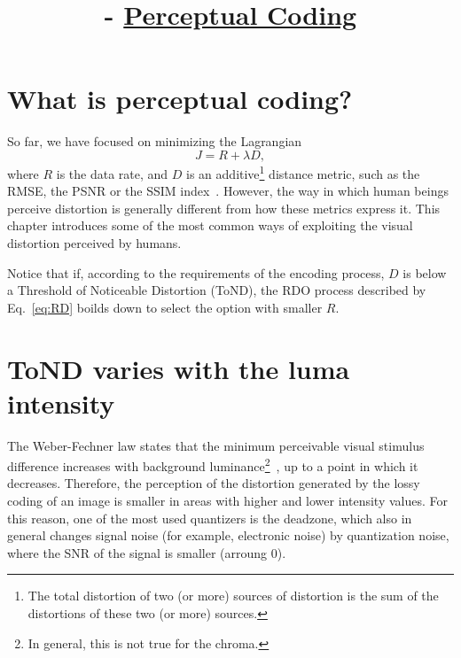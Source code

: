 

\title{\SM{} - \href{https://github.com/Sistemas-Multimedia/Sistemas-Multimedia.github.io/tree/master/contents/perceptual_coding}{Perceptual Coding}}

\maketitle
\tableofcontents

\section{What is perceptual coding?}

So far, we have focused on minimizing the
Lagrangian~\cite{sullivan1998rate}
\begin{equation}
  J = R + \lambda D,
  \label{eq:RD}
\end{equation}
where $R$ is the data rate, and $D$ is an additive\footnote{The total
distortion of two (or more) sources of distortion is the sum of the
distortions of these two (or more) sources.} distance metric, such as
the RMSE, the PSNR or the SSIM index~\cite{wang2004image}. However, the
way in which human beings perceive distortion is generally different
from how these metrics express it. This chapter introduces some of the
most common ways of exploiting the visual distortion perceived by
humans.

Notice that if, according to the requirements of the encoding process, $D$ is below
a Threshold of Noticeable Distortion (ToND), the RDO process described
by Eq.~\eqref{eq:RD} boilds down to select the option with smaller $R$.

\section{ToND varies with the luma intensity}

The Weber-Fechner law states that the minimum perceivable visual
stimulus difference increases with background
luminance\footnote{In general, this is not true for the
chroma.}~\cite{naccari2014perceptually}, up to a point in which it
decreases. Therefore, the perception of the distortion generated by
the lossy coding of an image is smaller in areas with higher and
lower intensity values. For this reason, one of the most used
quantizers is the deadzone, which also in general changes signal noise
(for example, electronic noise) by quantization noise, where the SNR
of the signal is smaller (arroung 0).

